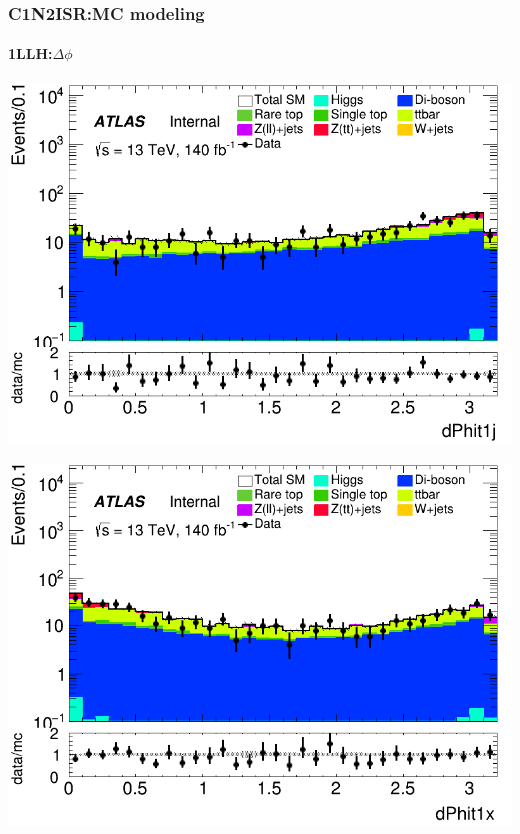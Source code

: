 \documentclass[usenames,dvipsnames]{beamer}
\begin{document}
\begin{frame}
\frametitle{C1N2ISR:MC modeling}
\framesubtitle{1LLH:\quad $\Delta\phi$}
    \begin{minipage}{0.32\textwidth}
        \centering
        \includegraphics[width=\textwidth]{graphics/LLH_met/LLH_met_dPhit1j.png}
    \end{minipage}
    \hfill
    \begin{minipage}{0.32\textwidth}
        \centering
        \includegraphics[width=\textwidth]{graphics/LLH_met/LLH_met_dPhit1x.png}
    \end{minipage}
    \hfill
    \begin{minipage}{0.32\textwidth}
        \centering

\end{minipage}
\end{frame}
\end{document}
